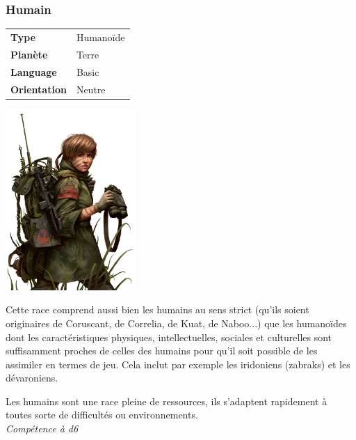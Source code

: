 \subsubsection{Humain}
\begin{samepage}
	\begin{flushright}
		\begin{tabular}{ l l }
			\textbf{Type} 			& Humanoïde \\
		   	\textbf{Planète} 		& Terre \\
		   	\textbf{Language} 		& Basic \\
		   	\textbf{Orientation} 	& Neutre \\
		\end{tabular}
	\end{flushright}

	\vspace{-6\baselineskip}
	\includegraphics[width=5cm]{img/races/humain.png} 
\end{samepage}

Cette race comprend aussi bien les humains au sens strict (qu’ils soient originaires de Coruscant, de Correlia, de Kuat, de Naboo...) que les humanoïdes dont les caractéristiques physiques, intellectuelles, sociales et culturelles sont suffisamment proches de celles des humains pour qu’il soit possible de les assimiler en termes de jeu. Cela inclut par exemple les iridoniens (zabraks) et les dévaroniens.

\begin{description}[align=left]
\item [Adaptabilité] 	%
	Les humains sont une race pleine de ressources, ils s'adaptent rapidement à toutes sorte de difficultés ou environnements.\\
	\emph{Compétence à d6}
\end{description}